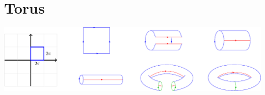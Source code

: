 \documentclass[11pt,openany]{article}
\begin{document}
\newpage
\section{Torus}
\begin{center}
\includegraphics[scale=.85]{../tikz/grad-math-tikz-algebra/torus.pdf}
\end{center}

%	
%	
%	
\end{document}
